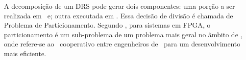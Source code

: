       A decomposição de um DRS pode gerar dois componentes: uma porção a ser realizada em \hardware\ e; outra executada em \software.
      Essa decisão de divisão é chamada de Problema de Particionamento.
      Segundo \cite{Sass2010}, para sistemas em FPGA, o particionamento é um sub-problema de um problema mais geral no âmbito de \codesign, onde refere-se ao \design\ cooperativo entre engenheiros de \hs\ para um desenvolvimento mais eficiente.%


